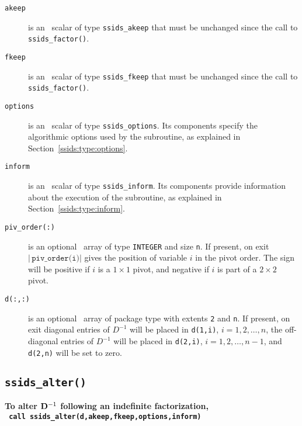 \begin{description}

\item[\texttt{akeep}]  is an \intentin\ scalar of type {\tt ssids\_akeep} that
must be unchanged since the call to {\tt ssids\_factor()}.

\item[\texttt{fkeep}]  is an \intentin\ scalar of type {\tt ssids\_fkeep} that
must be unchanged since the call to {\tt ssids\_factor()}.

\item[\texttt{options}] is an \intentin\ scalar of type {\tt ssids\_options}.
Its components specify the algorithmic options used by the subroutine, as
explained in Section~\ref{ssids:type:options}.

\item[\texttt{inform}] is an \intentout\ scalar of type
{\tt ssids\_inform}. Its components provide information about the execution
of the subroutine, as explained in Section~\ref{ssids:type:inform}.

\item[\texttt{piv\_order(:)}] is an optional \intentout\ array of type
{\tt INTEGER} and size {\tt n}. If present, on exit
$|\,\texttt{piv\_order(i)}|$ gives the position of variable $i$ in the pivot
order. The sign will be positive if $i$ is a $1\times1$ pivot, and negative
if $i$ is part of a $2 \times 2$ pivot.

\item[\texttt{d(:,:)}] is an optional \intentout\ array of package type with
extents {\tt 2} and {\tt n}.
If present, on exit diagonal entries of ${D}^{-1}$ will be placed
in {\tt d(1,i)}, $i = 1,2,\ldots,n$,
the off-diagonal entries  of ${D}^{-1}$ will be placed in
{\tt d(2,i)}, $i = 1,2,\ldots,n-1$, and
{\tt d(2,n)} will be set to zero.

\end{description}



\subsection{\texttt{ssids\_alter()}}
\textbf{To alter ${\bf D}^{-1}$ following an indefinite factorization,
   \vspace*{0.1cm} \\
   \texttt{ \hspace*{0.2cm}
      call ssids\_alter(d,akeep,fkeep,options,inform)
   }
}

